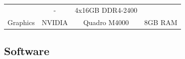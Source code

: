 \documentclass[11pt,singlespacinge,twoside]{reedthesis} %
\begin{document}
\begin{longtable}[]{@{}rccl@{}}
\begin{minipage}[t]{0.20\columnwidth}
\end{minipage} & \begin{minipage}[t]{0.22\columnwidth}\centering
-\strut
\end{minipage} & \begin{minipage}[t]{0.28\columnwidth}\raggedright
4x16GB DDR4-2400\strut
\end{minipage}\tabularnewline
\begin{minipage}[t]{0.19\columnwidth}\raggedleft
Graphics\strut
\end{minipage} & \begin{minipage}[t]{0.20\columnwidth}\centering
NVIDIA\strut
\end{minipage} & \begin{minipage}[t]{0.22\columnwidth}\centering
Quadro M4000\strut
\end{minipage} & \begin{minipage}[t]{0.28\columnwidth}\raggedright
8GB RAM\strut
\end{minipage}\tabularnewline
\bottomrule
\end{longtable}
\hypertarget{mat-sftwr}{%
\subsection{Software}\label{mat-sftwr}}
\end{document}
